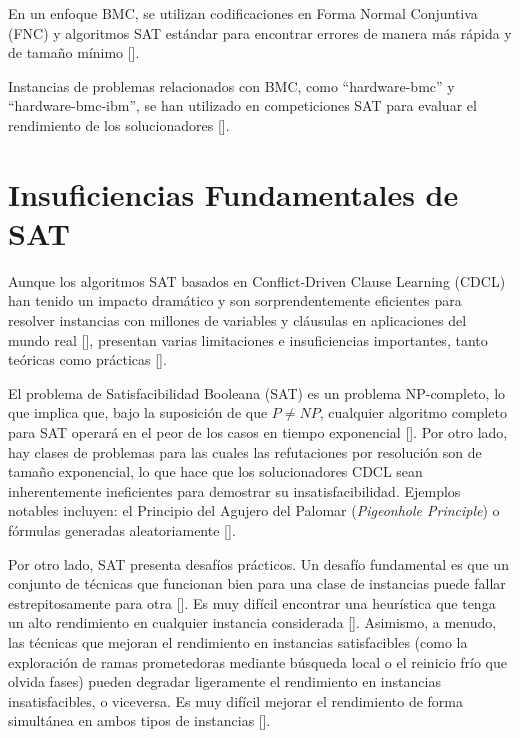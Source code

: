 En un enfoque BMC, se utilizan codificaciones en Forma Normal Conjuntiva (FNC) y algoritmos SAT estándar para encontrar errores de manera más rápida y de tamaño mínimo [\cite{hoos1998sat}].  %

Instancias de problemas relacionados con BMC, como ``hardware-bmc'' y ``hardware-bmc-ibm'', se han utilizado en competiciones SAT para evaluar el rendimiento de los solucionadores [\cite{biere2019restart_schemes}]. %

\section{Insuficiencias Fundamentales de SAT}
\label{sec:ineficiencia-sat}

Aunque los algoritmos SAT basados en Conflict-Driven Clause Learning (CDCL) han tenido un impacto dramático y son sorprendentemente eficientes para resolver instancias con millones de variables y cláusulas en aplicaciones del mundo real [\cite{li2024reset_rl}],  presentan varias limitaciones e insuficiencias importantes, tanto teóricas como prácticas [\cite{marques-silva2024cdcl}].

El problema de Satisfacibilidad Booleana (SAT) es un problema NP-completo, lo que implica que, bajo la suposición de que $P \neq NP$, cualquier algoritmo completo para SAT operará en el peor de los casos en tiempo exponencial [\cite{marques-silva2024cdcl}]. Por otro lado, hay clases de problemas para las cuales las refutaciones por resolución son de tamaño exponencial, lo que hace que los solucionadores CDCL sean inherentemente ineficientes para demostrar su insatisfacibilidad. Ejemplos notables incluyen: el Principio del Agujero del Palomar (\textit{Pigeonhole Principle}) o f\'ormulas generadas aleatoriamente  [\cite{ganesh_unreasonable}].

Por otro lado, SAT presenta desaf\'ios pr\'acticos. Un desafío fundamental es que un conjunto de técnicas que funcionan bien para una clase de instancias puede fallar estrepitosamente para otra [\cite{li2024reset_rl}]. Es muy difícil encontrar una heurística que tenga un alto rendimiento en cualquier instancia considerada [\cite{cherif2021combining}]. Asimismo, a menudo, las técnicas que mejoran el rendimiento en instancias satisfacibles (como la exploración de ramas prometedoras mediante búsqueda local o el reinicio frío que olvida fases) pueden degradar ligeramente el rendimiento en instancias insatisfacibles, o viceversa. Es muy difícil mejorar el rendimiento de forma simultánea en ambos tipos de instancias [\cite{cherif2024vsidschb}]. 

